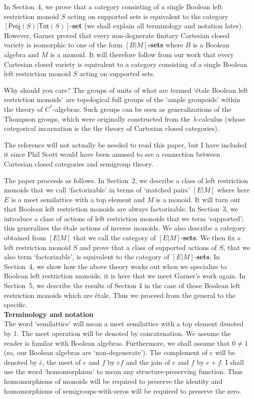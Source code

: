 \documentclass[a4paper]{amsart}
\begin{document}
In Section~4, we prove that a category consisting of a single Boolean left restriction monoid $S$
acting on supported sets
is equivalent to the category 
$[\mathsf{Proj}(S)|\mathsf{Tot}(S)]$-{\bf set}
(we shall explain all terminology and notation later).
However, Garner \cite{G2024, G2025} proved that 
every non-degnerate finitary Cartesian closed variety is isomorphic to one of the form {\bf $[B|M]$-sets}
where $B$ is a Boolean algebra and $M$ is a monoid.
It will therefore follow from our work that every Cartesian closed variety 
is equivalent to a category consisting of a single Boolean left restriction monoid $S$
acting on supported sets.

Why should you care? The groups of units of what are termed `\'etale Boolean left restriction monoids'
are topological full groups of the `ample groupoids' within the theory of $C^{\ast}$-algebras.
Such groups can be seen as generalizations of the Thompson groups, which were originally constructed from the $\lambda$-calculus
(whose categorical incarnation is the the theory of Cartesian closed categories).

The reference \cite{L1988} will not actually be needed to read this paper,
but I have included it since Phil Scott would have been amused to see a connection between
Cartesian closed categories and semigroup theory.

The paper proceeds as follows.
In Section~2,
we describe a class of left restriction monoids that we call `factorizable'
in terms of `matched pairs' $[E|M]$ where here $E$ is a meet semilattice with a top element
and $M$ is a monoid. 
It will turn out that Boolean left restriction monoids are always factorizable.
In Section~3,
we introduce a class of actions of left restriction monoids that we term `supported';
this generalizes the \'etale actions of inverse monoids.
We also describe a category obtained from $[E|M]$ that we call the category of $[E|M]$-{\bf sets}.
We then fix a left restriction monoid $S$ and prove that 
a class of supported actions of $S$, that we also term `factorizable', is equivalent to the category of $[E|M]$-{\bf sets}.
In Section~4, we show how the above theory works out when we specialize to  Boolean
left restriction monoids; it is here that we meet Garner's work again.
In Section~5, we describe the results of Section 4 in the case of those Boolean left restriction monoids which are \'etale.
Thus we proceed from the general to the specific.\\

\noindent
{\bf Terminology and notation}\\
The word `semilattice' will mean a meet semilattice with a top element denoted by 1.
The meet operation will be denoted by concatenation.
We assume the reader is familar with Boolean algebras.
Furthermore,  we shall assume that $0 \neq 1$ (so, our Boolean algebras are `non-degenerate').
The complement of $e$ will be denoted by $\bar{e}$,
the meet of $e$ and $f$ by $ef$
and the join of $e$ and $f$ by $e + f$.
I shall use the word `homomorphism' to mean any structure-preserving function.
Thus homomorphisms of monoids will be required to preserve the identity
and homomorphisms of semigroups-with-zeros will be required to preserve the zero.\\
\end{document}
